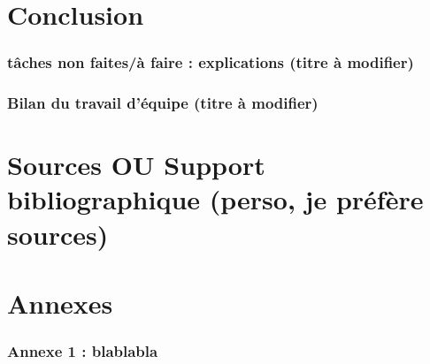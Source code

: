 \documentclass[a4paper,12pt]{article} %
\begin{document}
\part{Conclusion}
	\section{tâches non faites/à faire : explications (titre à modifier)}
	\section{Bilan du travail d'équipe (titre à modifier)}



\renewcommand\partname{}
\part{Sources OU Support bibliographique (perso, je préfère sources)}


\renewcommand\partname{}
\part{Annexes}
	\section*{Annexe 1 : blablabla}

\begin{figure}
\begin{center}
\end{center}
\end{figure}
\end{document}
